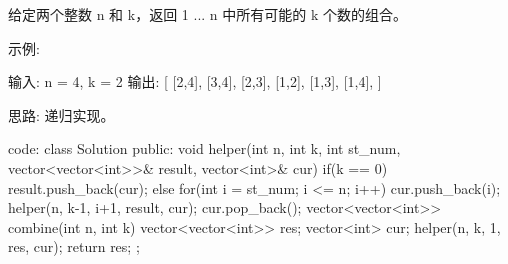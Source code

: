 给定两个整数 n 和 k，返回 1 ... n 中所有可能的 k 个数的组合。

示例:

输入: n = 4, k = 2
输出:
[
  [2,4],
  [3,4],
  [2,3],
  [1,2],
  [1,3],
  [1,4],
]
























思路:
递归实现。
























code:
class Solution {
public:
    void helper(int n, int k, int st_num, vector<vector<int>>& result, vector<int>& cur)
    {
        if(k == 0) result.push_back(cur);
        else
        {
            for(int i = st_num; i <= n; i++)
            {
                cur.push_back(i);
                helper(n, k-1, i+1, result, cur);
                cur.pop_back();
            }
        }
    }
    vector<vector<int>> combine(int n, int k) {
        vector<vector<int>> res;
        vector<int> cur;
        helper(n, k, 1, res, cur);
        return res;
    }
};